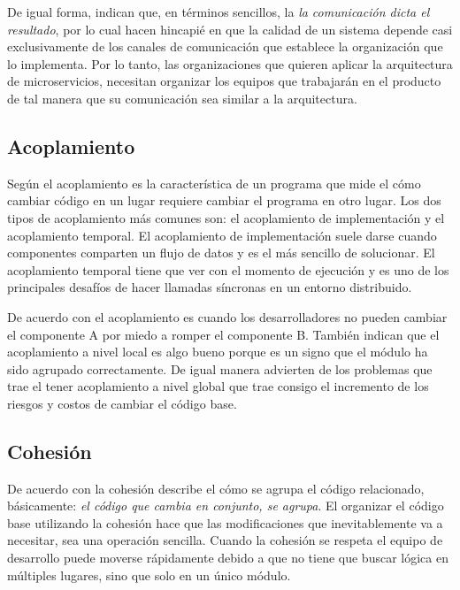 De igual forma, \cite{nadareishvili2016microservice} indican que, en términos sencillos, la
{\it la comunicación dicta el resultado}, por lo cual hacen hincapié en que la calidad de un sistema
depende casi exclusivamente de los canales de comunicación que establece la organización que lo implementa.
Por lo tanto, las organizaciones que quieren aplicar la arquitectura de microservicios, necesitan
organizar los equipos que trabajarán en el producto de tal manera que su comunicación sea similar a 
la arquitectura.


\subsection{Acoplamiento}

Según \cite{newman2019monolith} el acoplamiento es la característica de un programa que mide el cómo
cambiar código en un lugar requiere cambiar el programa en otro lugar.
Los dos tipos de acoplamiento más comunes son: el acoplamiento de implementación y el acoplamiento temporal.
El acoplamiento de implementación suele darse cuando componentes comparten un flujo de datos y es el más
sencillo de solucionar.
El acoplamiento temporal tiene que ver con el momento de ejecución y es uno de los principales
desafíos de hacer llamadas síncronas en un entorno distribuido.

De acuerdo con \cite{percival2020architecture} el acoplamiento es cuando los desarrolladores no
pueden cambiar el componente A por miedo a romper el componente B. También indican que el
acoplamiento a nivel local es algo bueno porque es un signo que el módulo ha sido agrupado correctamente.
De igual manera advierten de los problemas que trae el tener acoplamiento a nivel global que trae
consigo el incremento de los riesgos y costos de cambiar el código base.


\subsection{Cohesión}

De acuerdo con \cite{newman2019monolith} la cohesión describe el cómo se agrupa el código relacionado,
básicamente: {\it el código que cambia en conjunto, se agrupa}.
El organizar el código base utilizando la cohesión hace que las modificaciones que inevitablemente
va a necesitar, sea una operación sencilla.
Cuando la cohesión se respeta el equipo de desarrollo puede moverse rápidamente debido a que no tiene
que buscar lógica en múltiples lugares, sino que solo en un único módulo.

